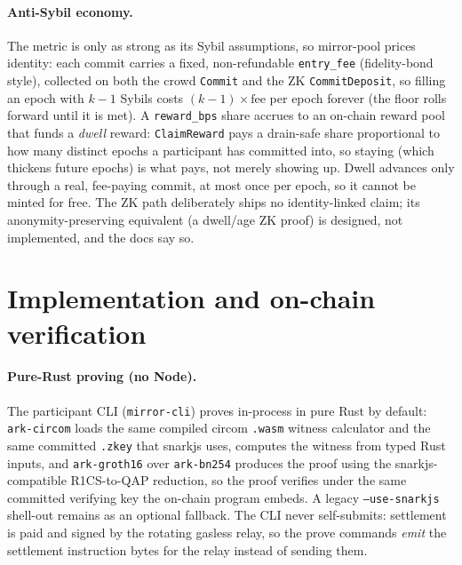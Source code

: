 \documentclass[10pt]{article}
\newcommand{\code}[1]{\texttt{#1}}
\begin{document}
\paragraph{Anti-Sybil economy.} The metric is only as strong as its Sybil
assumptions, so mirror-pool prices identity: each commit carries a fixed,
non-refundable \code{entry\_fee} (fidelity-bond style), collected on both the
crowd \code{Commit} and the ZK \code{CommitDeposit}, so filling an epoch with
$k{-}1$ Sybils costs $(k{-}1)\times\text{fee}$ per epoch forever (the floor rolls
forward until it is met). A \code{reward\_bps} share accrues to an on-chain reward
pool that funds a \emph{dwell} reward: \code{ClaimReward} pays a drain-safe share
proportional to how many distinct epochs a participant has committed into, so
staying (which thickens future epochs) is what pays, not merely showing up. Dwell
advances only through a real, fee-paying commit, at most once per epoch, so it
cannot be minted for free. The ZK path deliberately ships no identity-linked
claim; its anonymity-preserving equivalent (a dwell/age ZK proof) is designed, not
implemented, and the docs say so.

\section{Implementation and on-chain verification}
\label{sec:impl}

\paragraph{Pure-Rust proving (no Node).} The participant CLI (\code{mirror-cli})
proves in-process in pure Rust by default: \code{ark-circom} loads the same
compiled circom \code{.wasm} witness calculator and the same committed
\code{.zkey} that snarkjs uses, computes the witness from typed Rust inputs, and
\code{ark-groth16} over \code{ark-bn254} produces the proof using the
snarkjs-compatible R1CS-to-QAP reduction, so the proof verifies under the same
committed verifying key the on-chain program embeds. A legacy \code{--use-snarkjs}
shell-out remains as an optional fallback. The CLI never self-submits: settlement
is paid and signed by the rotating gasless relay, so the prove commands
\emph{emit} the settlement instruction bytes for the relay instead of sending
them.
\end{document}

